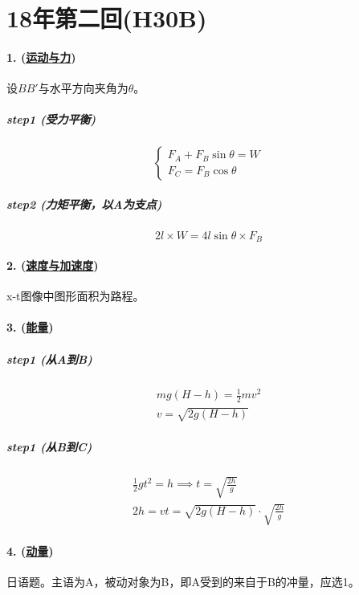 
\section{18年第二回(H30B)}

\paragraph{1. (\hyperref[subsec:运动与力]{运动与力})} 设$BB'$与水平方向夹角为$\theta$。

\subparagraph{step1 (受力平衡)}

\begin{equation*}
    \begin{cases}
        F_A+F_B\sin\theta=W\\
        F_C=F_B\cos\theta
    \end{cases}
\end{equation*}

\subparagraph{step2 (力矩平衡，以A为支点)}

\begin{equation*}
    2l\times W=4l\sin\theta\times F_B
\end{equation*}

\paragraph{2. (\hyperref[subsec:速度与加速度]{速度与加速度})} x-t图像中图形面积为路程。
\paragraph{3. (\hyperref[subsec:能量]{能量})}

\subparagraph{step1 (从A到B)}

\begin{gather*}
    mg(H-h)=\frac12mv^2\\
    v=\sqrt{2g(H-h)}
\end{gather*}

\subparagraph{step1 (从B到C)}

\begin{gather*}
    \frac12gt^2=h\implies t=\sqrt{\frac{2h}{g}}\\
    2h=vt=\sqrt{2g(H-h)}\cdot\sqrt{\frac{2h}{g}}
\end{gather*}

\paragraph{4. (\hyperref[subsec:动量]{动量})} 日语题。主语为A，被动对象为B，即A受到的来自于B的冲量，应选1。
